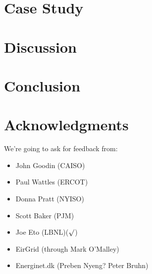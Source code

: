 \documentclass[a4paper,twocolumn,10pt]{article}
\begin{document}
\section{Case Study}
\label{sec:casestudy}


\section{Discussion}
\label{sec:discussion}


\section{Conclusion}
\label{sec:conclusion}

\section*{Acknowledgments}
We're going to ask for feedback from:
\begin{itemize}
	\item John Goodin (CAISO)
	\item Paul Wattles (ERCOT)
	\item Donna Pratt (NYISO)
	\item Scott Baker (PJM)
	\item Joe Eto (LBNL)($\surd$)
	\item EirGrid (through Mark O'Malley)
	\item Energinet.dk (Preben Nyeng? Peter Bruhn)
\end{itemize}
{}

\end{document}
